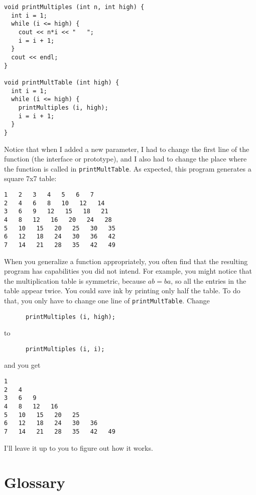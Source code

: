 \begin{verbatim}
void printMultiples (int n, int high) {
  int i = 1;
  while (i <= high) {
    cout << n*i << "   ";
    i = i + 1;
  }    
  cout << endl;
}

void printMultTable (int high) {
  int i = 1;
  while (i <= high) {
    printMultiples (i, high);
    i = i + 1;
  }
}
\end{verbatim}
%
Notice that when I added a new parameter, I had to change the first
line of the function (the interface or prototype), and I also had to
change the place where the function is called in {\tt printMultTable}.
As expected, this program generates a square 7x7 table:

\begin{verbatim}
1   2   3   4   5   6   7   
2   4   6   8   10   12   14   
3   6   9   12   15   18   21   
4   8   12   16   20   24   28   
5   10   15   20   25   30   35   
6   12   18   24   30   36   42   
7   14   21   28   35   42   49
\end{verbatim}
%
When you generalize a function appropriately, you often find
that the resulting program has capabilities you did not intend.
For example, you might notice that the multiplication table
is symmetric, because $ab = ba$, so all the entries in the
table appear twice.  You could save ink by printing only
half the table.  To do that, you only have to change one
line of {\tt printMultTable}.  Change

\begin{verbatim}
      printMultiples (i, high);
\end{verbatim}
%
to

\begin{verbatim}
      printMultiples (i, i);
\end{verbatim}
%
and you get

\begin{verbatim}
1   
2   4   
3   6   9   
4   8   12   16   
5   10   15   20   25   
6   12   18   24   30   36   
7   14   21   28   35   42   49  
\end{verbatim}
%
I'll leave it up to you to figure out how it works.

\section{Glossary}

